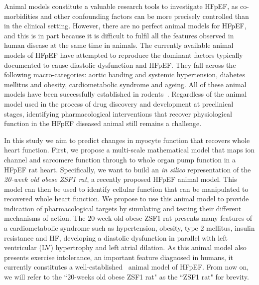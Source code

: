 Animal models constitute a valuable research tools to investigate HFpEF, as co-morbidities and other confounding factors can be more precisely controlled than in the clinical setting. However, there are no perfect animal models for HFpEF, and this is in part because it is difficult to fulfil all the features observed in human disease at the same time in animals. The currently available animal models of HFpEF have attempted to reproduce the dominant factors typically documented to cause diastolic dysfunction and HFpEF. They fall across the following macro-categories: aortic banding and systemic hypertension, diabetes mellitus and obesity, cardiometabolic syndrome and ageing. All of these animal models have been successfully established in rodents~\cite{Conceicao:2016}. Regardless of the animal model used in the process of drug discovery and development at preclinical stages, identifying pharmacological interventions that recover physiological function in the HFpEF diseased animal still remains a challenge.

In this study we aim to predict changes in myocyte function that recovers whole heart function. First, we propose a multi-scale mathematical model that maps ion channel and sarcomere function through to whole organ pump function in a HFpEF rat heart. Specifically, we want to build an \textit{in silico} representation of the \textit{20-week old obese ZSF1 rat}, a recently proposed HFpEF animal model. This model can then be used to identify cellular function that can be manipulated to recovered whole heart function. We propose to use this animal model to provide indication of pharmacological targets by simulating and testing their different mechanisms of action. The $20$-week old obese ZSF1 rat presents many features of a cardiometabolic syndrome such as hypertension, obesity, type $2$ mellitus, insulin resistance and HF, developing a diastolic dysfunction in parallel with left ventricular (LV) hypertrophy and left atrial dilation. As this animal model also presents exercise intolerance, an important feature diagnosed in humans, it currently constitutes a well-established~\cite{Conceicao:2016} animal model of HFpEF. From now on, we will refer to the ``$20$-weeks old obese ZSF1 rat" as the ``ZSF1 rat" for brevity.


%
%
%
